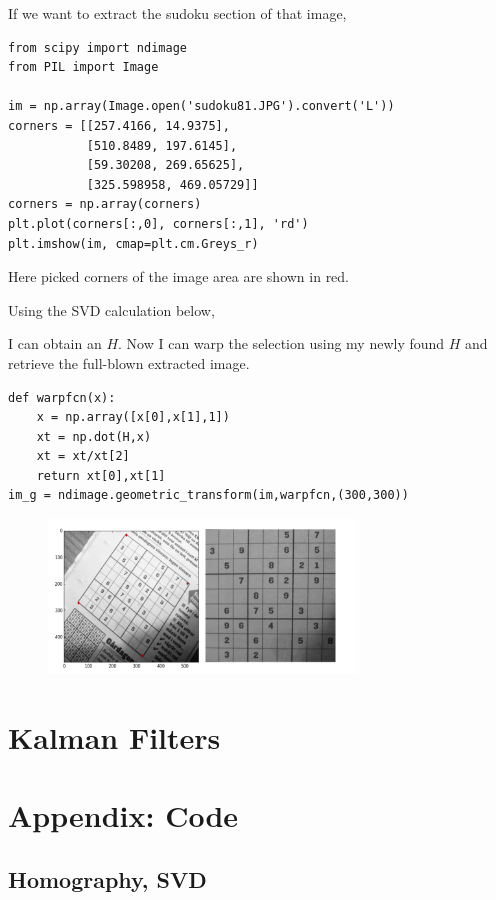 \documentclass{article}
\begin{document}
If we want to extract the sudoku section of that image,

\begin{verbatim}
from scipy import ndimage
from PIL import Image

im = np.array(Image.open('sudoku81.JPG').convert('L'))
corners = [[257.4166, 14.9375], 
           [510.8489, 197.6145], 
           [59.30208, 269.65625], 
           [325.598958, 469.05729]]
corners = np.array(corners)
plt.plot(corners[:,0], corners[:,1], 'rd')
plt.imshow(im, cmap=plt.cm.Greys_r)
\end{verbatim}

Here picked corners of the image area are shown in red. 

Using the SVD calculation below,

I can obtain an $H$. Now I can warp the selection using my newly found $H$ and
retrieve the full-blown extracted image. 

\begin{verbatim}
def warpfcn(x):
    x = np.array([x[0],x[1],1])
    xt = np.dot(H,x)
    xt = xt/xt[2]
    return xt[0],xt[1]
im_g = ndimage.geometric_transform(im,warpfcn,(300,300))
\end{verbatim}

\begin{figure}[h]
  \centering
  \includegraphics[width=22em]{out2.png}
\end{figure}


\section{Kalman Filters}


\section{Appendix: Code}

\subsection{Homography, SVD}
\end{document}
